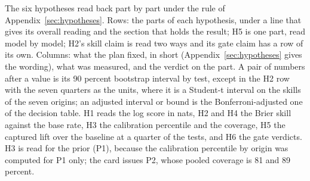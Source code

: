 \begin{table}[t]\centering\scriptsize
\caption{The six hypotheses read back part by part under the rule of Appendix~\ref{sec:hypotheses}. Rows: the parts of each hypothesis, under a line that gives its overall reading and the section that holds the result; H5 is one part, read model by model; H2's skill claim is read two ways and its gate claim has a row of its own. Columns: what the plan fixed, in short (Appendix~\ref{sec:hypotheses} gives the wording), what was measured, and the verdict on the part. A pair of numbers after a value is its 90 percent bootstrap interval by test, except in the H2 row with the seven quarters as the units, where it is a Student-t interval on the skills of the seven origins; an adjusted interval or bound is the Bonferroni-adjusted one of the decision table. H1 reads the log score in nats, H2 and H4 the Brier skill against the base rate, H3 the calibration percentile and the coverage, H5 the captured lift over the baseline at a quarter of the tests, and H6 the gate verdicts. H3 is read for the prior (P1), because the calibration percentile by origin was computed for P1 only; the card issues P2, whose pooled coverage is 81 and 89 percent.}
\label{tab:verdicts}

\end{table}

